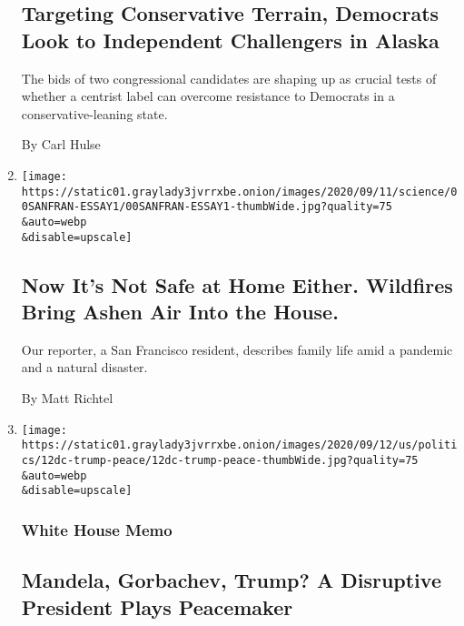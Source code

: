\begin{enumerate}
  \hypertarget{targeting-conservative-terrain-democrats-look-to-independent-challengers-in-alaska}{%
  \subsection{Targeting Conservative Terrain, Democrats Look to
  Independent Challengers in
  Alaska}\label{targeting-conservative-terrain-democrats-look-to-independent-challengers-in-alaska}}

  The bids of two congressional candidates are shaping up as crucial
  tests of whether a centrist label can overcome resistance to Democrats
  in a conservative-leaning state.

  By Carl Hulse
\item
  \href{/2020/09/12/health/fires-air-california.html}{}

  \texttt{[image: https://static01.graylady3jvrrxbe.onion/images/2020/09/11/science/00SANFRAN-ESSAY1/00SANFRAN-ESSAY1-thumbWide.jpg?quality=75\\\&auto=webp\\\&disable=upscale]}

  \hypertarget{now-its-not-safe-at-home-either-wildfires-bring-ashen-air-into-the-house}{%
  \subsection{Now It's Not Safe at Home Either. Wildfires Bring Ashen
  Air Into the
  House.}\label{now-its-not-safe-at-home-either-wildfires-bring-ashen-air-into-the-house}}

  Our reporter, a San Francisco resident, describes family life amid a
  pandemic and a natural disaster.

  By Matt Richtel
\item
  \href{/2020/09/12/us/politics/trump-nobel-peace-prize.html}{}

  \texttt{[image: https://static01.graylady3jvrrxbe.onion/images/2020/09/12/us/politics/12dc-trump-peace/12dc-trump-peace-thumbWide.jpg?quality=75\\\&auto=webp\\\&disable=upscale]}

  \hypertarget{white-house-memo}{%
  \subsubsection{White House Memo}\label{white-house-memo}}

  \hypertarget{mandela-gorbachev-trump-a-disruptive-president-plays-peacemaker}{%
  \subsection{Mandela, Gorbachev, Trump? A Disruptive President Plays
  Peacemaker}\label{mandela-gorbachev-trump-a-disruptive-president-plays-peacemaker}}


\end{enumerate}
